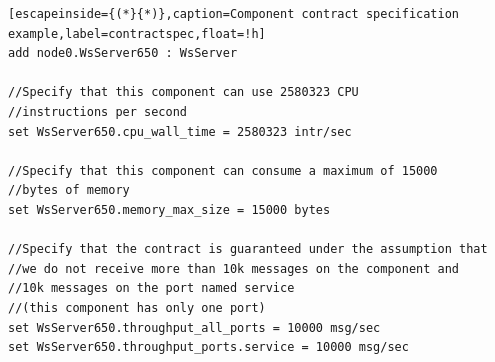 \begin{lstlisting}[escapeinside={(*}{*)},caption=Component contract specification example,label=contractspec,float=!h]
add node0.WsServer650 : WsServer

//Specify that this component can use 2580323 CPU 
//instructions per second
set WsServer650.cpu_wall_time = 2580323 intr/sec 

//Specify that this component can consume a maximum of 15000
//bytes of memory
set WsServer650.memory_max_size = 15000 bytes

//Specify that the contract is guaranteed under the assumption that 
//we do not receive more than 10k messages on the component and 
//10k messages on the port named service
//(this component has only one port)
set WsServer650.throughput_all_ports = 10000 msg/sec
set WsServer650.throughput_ports.service = 10000 msg/sec

\end{lstlisting}


